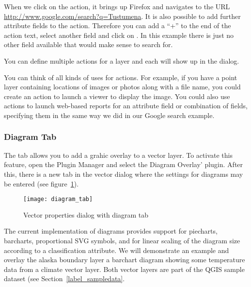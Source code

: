 When we click on the action, it brings up Firefox and navigates to the URL
\url{http://www.google.com/search?q=Tustumena}. It is also possible to add further 
attribute fields to the action. Therefore you can add a ``+'' to the end of the action 
text, select another field and click on . In this example there 
is just no other field available that would make sense to search for.

You can define multiple actions for a layer and each will show up in the
 dialog. 

You can think of all kinds of uses for actions. For example, if you have a point layer
containing locations of images or photos along with a file name, you could
create an action to launch a viewer to display the image. You could also use
actions to launch web-based reports for an attribute field or combination of
fields, specifying them in the same way we did in our Google search example.

\subsubsection{Diagram Tab}\label{sec:diagram}

The  tab allows you to add a grahic overlay to a vector layer.
To activate this feature, open the Plugin Manager and select the Diagram Overlay' 
plugin. After this, there is a new tab in the vector  dialog where the settings for diagrams may be entered (see
figure~\ref{fig:diagramtab}).

\begin{figure}[ht]
   \begin{center}
   \caption{Vector properties dialog with diagram tab \nixcaption}\label{fig:diagramtab}\smallskip
   \texttt{[image: diagram\_tab]}
\end{center}
\end{figure}

The current implementation of diagrams provides support for piecharts, barcharts, 
proportional SVG symbols, and for linear scaling of the diagram size according 
to a classification attribute. We will demonstrate an example and overlay the 
alaska boundary layer a barchart diagram showing some temperature data from 
a climate vector layer. Both vector layers are part of the QGIS sample dataset (see
Section~\ref{label_sampledata}.

